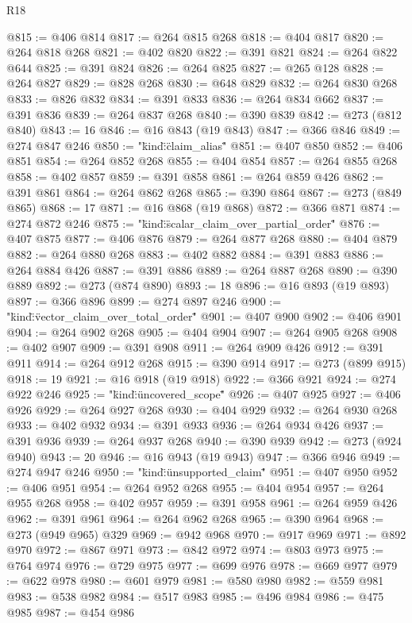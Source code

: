 \begin{lexlean}{R18}
\begin{coremodule}
{{{{{{{{{{{{{{{{{{{{{{{{{{{{{{{{{{{{{{{{{{{{{{{{{{{{{{{{{{{{{{{{{{{{{{{{{{{{{{{{{{{{{{{{{{{{{{{{{{{{{{{{{{{{{{{{{{{{{{{{{{{{{{{{{{{{{{{{{{@815 := @406 @814
@817 := @264 @815 @268
@818 := @404 @817
@820 := @264 @818 @268
@821 := @402 @820
@822 := @391 @821
@824 := @264 @822 @644
@825 := @391 @824
@826 := @264 @825
@827 := @265 @128
@828 := @264 @827
@829 := @828 @268
@830 := @648 @829
@832 := @264 @830 @268
@833 := @826 @832
@834 := @391 @833
@836 := @264 @834 @662
@837 := @391 @836
@839 := @264 @837 @268
@840 := @390 @839
@842 := @273 (@812 @840)
@843 := 16
@846 := @16 @843 (@19 @843)
@847 := @366 @846
@849 := @274 @847 @246
@850 := "{\"kind\":\"claim_alias\""
@851 := @407 @850
@852 := @406 @851
@854 := @264 @852 @268
@855 := @404 @854
@857 := @264 @855 @268
@858 := @402 @857
@859 := @391 @858
@861 := @264 @859 @426
@862 := @391 @861
@864 := @264 @862 @268
@865 := @390 @864
@867 := @273 (@849 @865)
@868 := 17
@871 := @16 @868 (@19 @868)
@872 := @366 @871
@874 := @274 @872 @246
@875 := "{\"kind\":\"scalar_claim_over_partial_order\""
@876 := @407 @875
@877 := @406 @876
@879 := @264 @877 @268
@880 := @404 @879
@882 := @264 @880 @268
@883 := @402 @882
@884 := @391 @883
@886 := @264 @884 @426
@887 := @391 @886
@889 := @264 @887 @268
@890 := @390 @889
@892 := @273 (@874 @890)
@893 := 18
@896 := @16 @893 (@19 @893)
@897 := @366 @896
@899 := @274 @897 @246
@900 := "{\"kind\":\"vector_claim_over_total_order\""
@901 := @407 @900
@902 := @406 @901
@904 := @264 @902 @268
@905 := @404 @904
@907 := @264 @905 @268
@908 := @402 @907
@909 := @391 @908
@911 := @264 @909 @426
@912 := @391 @911
@914 := @264 @912 @268
@915 := @390 @914
@917 := @273 (@899 @915)
@918 := 19
@921 := @16 @918 (@19 @918)
@922 := @366 @921
@924 := @274 @922 @246
@925 := "{\"kind\":\"uncovered_scope\""
@926 := @407 @925
@927 := @406 @926
@929 := @264 @927 @268
@930 := @404 @929
@932 := @264 @930 @268
@933 := @402 @932
@934 := @391 @933
@936 := @264 @934 @426
@937 := @391 @936
@939 := @264 @937 @268
@940 := @390 @939
@942 := @273 (@924 @940)
@943 := 20
@946 := @16 @943 (@19 @943)
@947 := @366 @946
@949 := @274 @947 @246
@950 := "{\"kind\":\"unsupported_claim\""
@951 := @407 @950
@952 := @406 @951
@954 := @264 @952 @268
@955 := @404 @954
@957 := @264 @955 @268
@958 := @402 @957
@959 := @391 @958
@961 := @264 @959 @426
@962 := @391 @961
@964 := @264 @962 @268
@965 := @390 @964
@968 := @273 (@949 @965) @329
@969 := @942 @968
@970 := @917 @969
@971 := @892 @970
@972 := @867 @971
@973 := @842 @972
@974 := @803 @973
@975 := @764 @974
@976 := @729 @975
@977 := @699 @976
@978 := @669 @977
@979 := @622 @978
@980 := @601 @979
@981 := @580 @980
@982 := @559 @981
@983 := @538 @982
@984 := @517 @983
@985 := @496 @984
@986 := @475 @985
@987 := @454 @986
}}}}}}}}}}}}}}}}}}}}}}}}}}}}}}}}}}}}}}}}}}}}}}}}}}}}}}}}}}}}}}}}}}}}}}}}}}}}}}}}}}}}}}}}}}}}}}}}}}}}}}}}}}}}}}}}}}}}}}}}}}}}}}}}}}}}}}}}}}}}}}}
\end{coremodule}
\end{lexlean}
